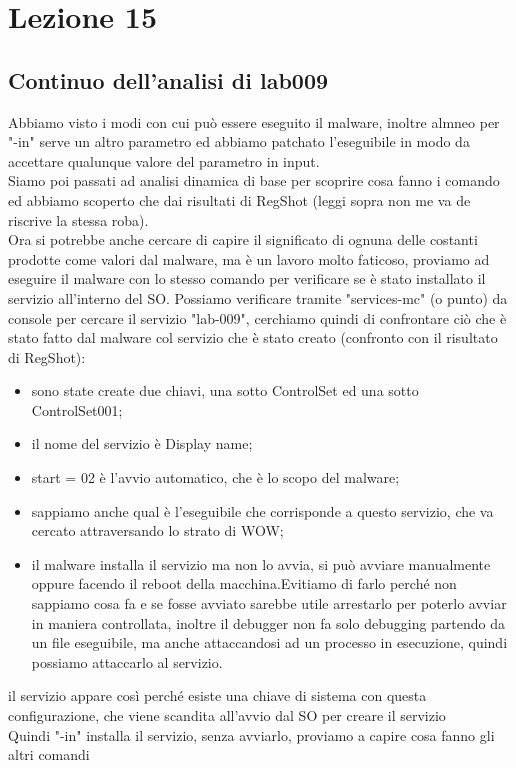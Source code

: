 \documentclass[12pt, oneside]{extbook}
\begin{document}
\chapter{Lezione 15}
\section{Continuo dell'analisi di lab009}
Abbiamo visto i modi con cui può essere eseguito il malware, inoltre almneo per "-in" serve un altro parametro ed abbiamo patchato l'eseguibile in modo da accettare qualunque valore del parametro in input.\\Siamo poi passati ad analisi dinamica di base per scoprire cosa fanno i comando ed abbiamo scoperto che dai risultati di RegShot (leggi sopra non me va de riscrive la stessa roba).\\Ora si potrebbe anche cercare di capire il significato di ognuna delle costanti prodotte come valori dal malware, ma è un lavoro molto faticoso, proviamo ad eseguire il malware con lo stesso comando per verificare se è stato installato il servizio all'interno del SO. Possiamo verificare tramite "services-mc" (o punto) da console per cercare il servizio "lab-009", cerchiamo quindi di confrontare ciò che è stato fatto dal malware col servizio che è stato creato (confronto con il risultato di RegShot):
\begin{itemize}
\item sono state create due chiavi, una sotto ControlSet ed una sotto ControlSet001;
\item il nome del servizio è Display name;
\item start = 02 è l'avvio automatico, che è lo scopo del malware;
\item sappiamo anche qual è l'eseguibile che corrisponde a questo servizio, che va cercato attraversando lo strato di WOW;
\item il malware installa il servizio ma non lo avvia, si può avviare manualmente oppure facendo il reboot della macchina.Evitiamo di farlo perché non sappiamo cosa fa e se fosse avviato sarebbe utile arrestarlo per poterlo avviar in maniera controllata, inoltre il debugger non fa solo debugging partendo da un file eseguibile, ma anche attaccandosi ad un processo in esecuzione, quindi possiamo attaccarlo al servizio.
\end{itemize}
il servizio appare così perché esiste una chiave di sistema con questa configurazione, che viene scandita all'avvio dal SO per creare il servizio\\Quindi "-in" installa il servizio, senza avviarlo, proviamo a capire cosa fanno gli altri comandi
\end{document}
